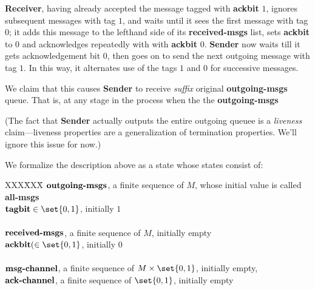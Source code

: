 \textbf{Receiver}, having already accepted the message tagged with
\textbf{ackbit} $1$, ignores subsequent messages with tag $1$, and
waits until it sees the first message with tag $0$; it adds this
message to the lefthand side of its \textbf{received-msgs} list, sets
\textbf{ackbit} to 0 and acknowledges repeatedly with with
\textbf{ackbit} $0$.  \textbf{Sender} now waits till it gets
acknowledgement bit $0$, then goes on to send the next outgoing
message with tag $1$.  In this way, it alternates use of the tags $1$
and $0$ for successive messages.

We claim that this causes \textbf{Sender} to receive \emph{suffix}
original \textbf{outgoing-msgs} queue.  That is, at any stage in the
process when the the \textbf{outgoing-msgs}

(The fact that \textbf{Sender} actually outputs the entire outgoing
queuee is a \emph{liveness} claim---liveness properties are a
generalization of termination properties.  We'll ignore this issue for
now.)

We formalize the description above as a state whose states consist of:
\begin{tabbing}
XXX\=XXX\= \kill \> $\text{\textbf{outgoing-msgs}}$, a finite sequence of $M$,
whose initial value is called \textbf{all-msgs}\\ \> $\text{\textbf{tagbit}} \in
\set{0, 1}$, initially $1$ \\ \\ \> $\text{\textbf{received-msgs}}$, a finite
sequence of $M$, initially empty\\ \> $\text{\textbf{ackbit}}( \in \set{0, 1}$,
initially $0$ \\ \\ \> $\text{\textbf{msg-channel}}$, a finite sequence of $M
\times \set{0, 1}$, initially empty, \\ \> $\text{\textbf{ack-channel}}$, a
finite sequence of $\set{0, 1}$, initially empty
\end{tabbing}

